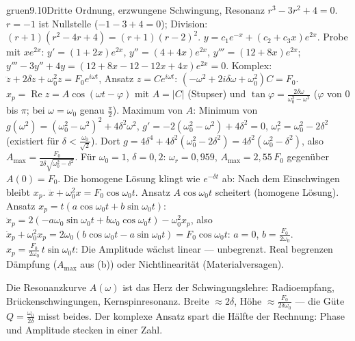 \begin{loesungkarte}{gruen}{9.10}{Dritte Ordnung, erzwungene Schwingung, Resonanz}
$r^{3} - 3r^{2} + 4 = 0$. $r = -1$ ist Nullstelle ($-1 - 3 + 4 = 0$); Division: $(r + 1)(r^{2} - 4r + 4) = (r + 1)(r - 2)^{2}$. $y = c_1e^{-x} + (c_2 + c_3x)e^{2x}$. Probe mit $xe^{2x}$: $y' = (1 + 2x)e^{2x}$, $y'' = (4 + 4x)e^{2x}$, $y''' = (12 + 8x)e^{2x}$; $y''' - 3y'' + 4y = (12 + 8x - 12 - 12x + 4x)e^{2x} = 0$. \checkmark
{}
Komplex: $\ddot z + 2\delta\dot z + \omega_0^{2}z = F_0e^{i\omega t}$, Ansatz $z = Ce^{i\omega t}$: $(-\omega^{2} + 2i\delta\omega + \omega_0^{2})C = F_0$. $x_p = \operatorname{Re}z = A\cos(\omega t - \varphi)$ mit $A = |C|$ (Stupser) und $\tan\varphi = \frac{2\delta\omega}{\omega_0^{2} - \omega^{2}}$ ($\varphi$ von $0$ bis $\pi$; bei $\omega = \omega_0$ genau $\frac\pi2$). Maximum von $A$: Minimum von $g(\omega^{2}) = (\omega_0^{2} - \omega^{2})^{2} + 4\delta^{2}\omega^{2}$, $g' = -2(\omega_0^{2} - \omega^{2}) + 4\delta^{2} = 0$, $\omega_r^{2} = \omega_0^{2} - 2\delta^{2}$ (existiert für $\delta < \frac{\omega_0}{\sqrt2}$). Dort $g = 4\delta^{4} + 4\delta^{2}(\omega_0^{2} - 2\delta^{2}) = 4\delta^{2}(\omega_0^{2} - \delta^{2})$, also $A_{\max} = \frac{F_0}{2\delta\sqrt{\omega_0^{2} - \delta^{2}}}$. Für $\omega_0 = 1$, $\delta = 0{,}2$: $\omega_r = 0{,}959$, $A_{\max} = 2{,}55\,F_0$ gegenüber $A(0) = F_0$. Die homogene Lösung klingt wie $e^{-\delta t}$ ab: Nach dem Einschwingen bleibt $x_p$.
$\ddot x + \omega_0^{2}x = F_0\cos\omega_0t$. Ansatz $A\cos\omega_0t$ scheitert (homogene Lösung). Ansatz $x_p = t(a\cos\omega_0t + b\sin\omega_0t)$: $\ddot x_p = 2(-a\omega_0\sin\omega_0t + b\omega_0\cos\omega_0t) - \omega_0^{2}x_p$, also $\ddot x_p + \omega_0^{2}x_p = 2\omega_0(b\cos\omega_0t - a\sin\omega_0t) = F_0\cos\omega_0t$: $a = 0$, $b = \frac{F_0}{2\omega_0}$. $x_p = \frac{F_0}{2\omega_0}\,t\sin\omega_0t$: Die Amplitude wächst linear --- unbegrenzt. Real begrenzen Dämpfung ($A_{\max}$ aus (b)) oder Nichtlinearität (Materialversagen).
\begin{mitnehmen}\kastentext
Die Resonanzkurve $A(\omega)$ ist das Herz der Schwingungslehre: Radioempfang, Brückenschwingungen, Kernspinresonanz. Breite $\approx2\delta$, Höhe $\approx\frac{F_0}{2\delta\omega_0}$ --- die Güte $Q = \frac{\omega_0}{2\delta}$ misst beides. Der komplexe Ansatz spart die Hälfte der Rechnung: Phase und Amplitude stecken in einer Zahl.
\end{mitnehmen}
\end{loesungkarte}


